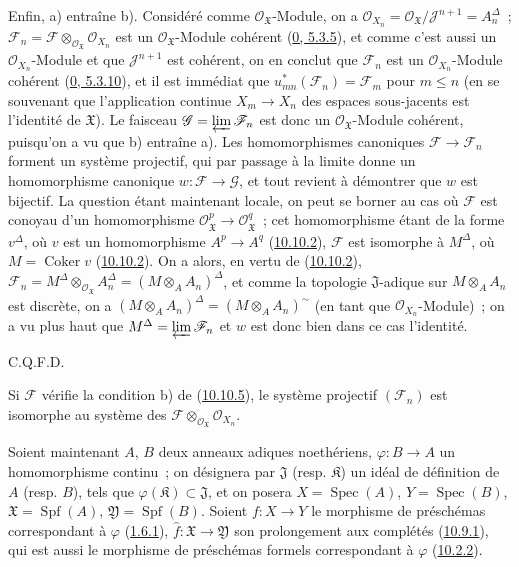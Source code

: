 Enfin, a) entraîne b). Considéré comme
$\mathscr{O}_{\mathfrak{X}}$-Module, on a
$\mathscr{O}_{X_n}=\mathscr{O}_{\mathfrak{X}}/
\mathscr{J}^{n+1}=A_n^\Delta$~; $\mathscr{F}_n=\mathscr{F}
\otimes_{\mathscr{O}_{\mathfrak{X}}}\mathscr{O}_{X_n}$ est un
$\mathscr{O}_{\mathfrak{X}}$-Module cohérent
(\hyperref[0.5.3.5-fr]{0, 5.3.5}), et comme c'est aussi un
$\mathscr{O}_{X_n}$-Module et que $\mathscr{J}^{n+1}$ est cohérent,
on en conclut que $\mathscr{F}_n$ est un
$\mathscr{O}_{X_n}$-Module cohérent
(\hyperref[0.5.3.10-fr]{0, 5.3.10}), et il est immédiat que
$u_{mn}^*(\mathscr{F}_n)=\mathscr{F}_m$ pour $m\leq n$ (en se
souvenant que l'application continue $X_m\to X_n$ des espaces
sous-jacents est l'identité de $\mathfrak{X}$). Le faisceau
$\mathscr{G}=\varprojlim\mathscr{F}_n$ est donc un
$\mathscr{O}_{\mathfrak{X}}$-Module cohérent, puisqu'on a vu que b)
entraîne a). Les homomorphismes canoniques
$\mathscr{F}\to\mathscr{F}_n$ forment un système projectif, qui par
passage à la limite donne un homomorphisme canonique
$w:\mathscr{F}\to\mathscr{G}$, et tout revient à démontrer que $w$ est
bijectif. La question étant maintenant locale, on peut se borner au cas
où $\mathscr{F}$ est conoyau d'un homomorphisme
$\mathscr{O}_{\mathfrak{X}}^p\to\mathscr{O}_{\mathfrak{X}}^q$~; cet
homomorphisme étant de la forme $v^\Delta$, où $v$ est un homomorphisme
$A^p\to A^q$ (\hyperref[I.10.10.2-fr]{10.10.2}), $\mathscr{F}$ est
isomorphe à $M^\Delta$, où $M=\operatorname{Coker}v$
(\hyperref[I.10.10.2-fr]{10.10.2}). On a alors, en vertu de
(\hyperref[I.10.10.2-fr]{10.10.2}),
$\mathscr{F}_n=M^\Delta\otimes_{\mathscr{O}_{\mathfrak{X}}}A_n^\Delta
=(M\otimes_A A_n)^\Delta$, et comme la topologie $\mathfrak{J}$-adique
sur $M\otimes_A A_n$ est discrète, on a
$(M\otimes_A A_n)^\Delta=(M\otimes_A A_n)^{\sim}$ (en tant que
$\mathscr{O}_{X_n}$-Module)~; on a vu plus haut que
$M^\Delta=\varprojlim\mathscr{F}_n$ et $w$ est donc bien dans ce cas
l'identité.
\par\hfill C.Q.F.D.\par

\begin{corollary}[10.10.6]
\label{I.10.10.6-fr}
Si $\mathscr{F}$ vérifie la condition b) de
(\hyperref[I.10.10.5-fr]{10.10.5}), le système projectif
$(\mathscr{F}_n)$ est isomorphe au système des
$\mathscr{F}\otimes_{\mathscr{O}_{\mathfrak{X}}}\mathscr{O}_{X_n}$.
\end{corollary}

\begin{env}[10.10.7]
\label{I.10.10.7-fr}
Soient maintenant $A$, $B$ deux anneaux adiques noethériens,
$\varphi:B\to A$ un homomorphisme continu~; on désignera par
$\mathfrak{J}$ (resp. $\mathfrak{K}$) un idéal de définition de $A$
(resp. $B$), tels que $\varphi(\mathfrak{K})\subset\mathfrak{J}$, et
on posera $X=\operatorname{Spec}(A)$, $Y=\operatorname{Spec}(B)$,
$\mathfrak{X}=\operatorname{Spf}(A)$,
$\mathfrak{Y}=\operatorname{Spf}(B)$. Soient $f:X\to Y$ le morphisme
de préschémas correspondant à $\varphi$
(\hyperref[I.1.6.1-fr]{1.6.1}), $\widehat f:\mathfrak{X}\to
\mathfrak{Y}$ son prolongement aux complétés
(\hyperref[I.10.9.1-fr]{10.9.1}), qui est aussi le morphisme de
préschémas formels correspondant à $\varphi$
(\hyperref[I.10.2.2-fr]{10.2.2}).
\end{env}

